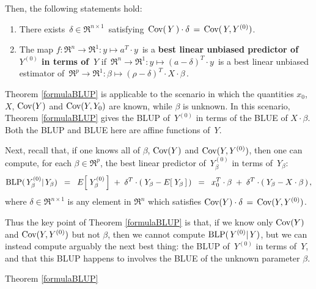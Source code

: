 \begin{theorem}
Then, the following statements hold:
\begin{enumerate}
\item
	There exists \,$\delta \in \Re^{n \times 1}$\, satisfying \,$\textnormal{Cov}(\,Y\,) \cdot \delta \,=\, \textnormal{Cov}(\,Y,Y^{(0)})$.
\item
	The map $f : \Re^{n} \longrightarrow \Re^{1} : y \longmapsto a^{T} \cdot y$\,
	is a \textbf{\color{red}best linear unbiased predictor of \,$Y^{(0)}$ in terms of \,$Y$} if
	\,$\Re^{n} \longrightarrow \Re^{1} : y \longmapsto (a - \delta)^{T} \cdot y$\,
	is a best linear unbiased estimator of 
	\,$\Re^{p} \longrightarrow \Re^{1} : \beta \longmapsto (\rho - \delta)^{T} \cdot X \cdot \beta$\,.
\end{enumerate}
\end{theorem}

\begin{remark}
\mbox{}
\vskip 0.05cm
\noindent
Theorem \ref{formulaBLUP} is applicable to the scenario in which
the quantities $x_{0}$, $X$, $\textnormal{Cov}(Y)$ and $\textnormal{Cov}(Y,Y_{0})$ are {\color{red}known}, while
{\color{red}$\beta$ is unknown}.
In this scenario, Theorem \ref{formulaBLUP} gives the BLUP of
\,$Y^{(0)}$ in terms of the BLUE of $X\cdot\beta$.
Both the BLUP and BLUE here are affine functions of \,$Y$.

Next, recall that, if one knows all of $\beta$, $\textnormal{Cov}(Y)$ and $\textnormal{Cov}(Y,Y^{(0)})$,
then one can compute, for each $\beta\in\Re^{p}$,
the {\color{red}best linear predictor of \,$Y^{(0)}_{\beta}$ in terms of \,$Y_{\beta}$}:
\begin{equation*}
\textnormal{BLP}(\,Y^{(0)}_{\beta}\vert\,Y_{\beta})
\;\; = \;\;
	E\!\left[\;Y^{(0)}_{\beta}\,\right] \; + \; \delta^{T}\cdot(\;Y_{\beta} - E\!\left[\;Y_{\beta}\,\right]\,)
\;\; = \;\;
	x_{0}^{T}\cdot\beta \; + \; \delta^{T}\cdot(\;Y_{\beta} - X\cdot\beta\,)\,,
\end{equation*}
where $\delta \in \Re^{n \times 1}$ is any element in $\Re^{n}$ which satisfies
$\textnormal{Cov}(Y) \cdot \delta \,=\, \textnormal{Cov}(Y,Y^{(0)})$.

Thus the key point of Theorem \ref{formulaBLUP} is that,
if we know only $\textnormal{Cov}(Y)$ and $\textnormal{Cov}(Y,Y^{(0)})$ but not $\beta$, then we cannot
compute $\textnormal{BLP}(\,Y^{(0)}\vert\,Y)$, but we can instead compute arguably the next best thing:
the BLUP of \,$Y^{(0)}$ in terms of \,$Y$, and that this BLUP happens to involves
the BLUE of the unknown parameter $\beta$.
\end{remark}

\proofof Theorem \ref{formulaBLUP}

